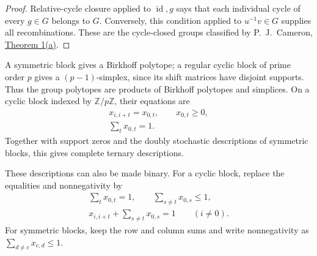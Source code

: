\begin{proof}
Relative-cycle closure applied to $\operatorname{id},g$ says that each
individual cycle of every $g\in G$ belongs to $G$. Conversely, this
condition applied to $u^{-1}v\in G$ supplies all recombinations.
These are the cycle-closed groups classified by P.~J.~Cameron,
\href{https://emis.muni.cz/journals/JACO/Volume5_4/b38540n353g51u18.fulltext.pdf}{Theorem 1(a)}.
\end{proof}

A symmetric block gives a Birkhoff polytope; a regular cyclic block
of prime order $p$ gives a $(p-1)$-simplex, since its shift matrices
have disjoint supports. Thus the group polytopes are products of
Birkhoff polytopes and simplices. On a cyclic block indexed by
$\mathbb Z/p\mathbb Z$, their equations are
\[
 \begin{gathered}
 x_{i,i+t}=x_{0,t},\qquad x_{0,t}\geq0,\\
 \sum_t x_{0,t}=1.
 \end{gathered}
\]
Together with support zeros and the doubly stochastic descriptions of
symmetric blocks, this gives complete ternary descriptions.

These descriptions can also be made binary. For a cyclic block, replace
the equalities and nonnegativity by
\[
 \begin{gathered}
 \sum_t x_{0,t}=1,\qquad \sum_{s\ne t}x_{0,s}\leq1,\\
 x_{i,i+t}+\sum_{s\ne t}x_{0,s}=1\qquad(i\ne0).
 \end{gathered}
\]
For symmetric blocks, keep the row and column sums and write
nonnegativity as $\sum_{d\ne c}x_{e,d}\leq1$.
